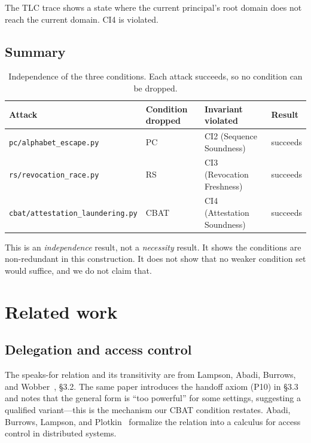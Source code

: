 \documentclass[11pt,a4paper]{article}
\theoremstyle{plain}
\theoremstyle{definition}
\theoremstyle{remark}
\begin{document}
The TLC trace shows a state where the current principal's root domain does
not reach the current domain. CI4 is violated.

\subsection{Summary}

\begin{table}[t]
\centering
\small
\begin{tabular}{@{}llll@{}}
\toprule
\textbf{Attack} & \textbf{Condition dropped} & \textbf{Invariant violated} & \textbf{Result} \\
\midrule
\texttt{pc/alphabet\_escape.py} & PC & CI2 (Sequence Soundness) & succeeds \\
\texttt{rs/revocation\_race.py} & RS & CI3 (Revocation Freshness) & succeeds \\
\texttt{cbat/attestation\_laundering.py} & CBAT & CI4 (Attestation Soundness) & succeeds \\
\bottomrule
\end{tabular}
\caption{Independence of the three conditions. Each attack succeeds, so no
condition can be dropped.}
\label{tab:independence}
\end{table}

This is an \emph{independence} result, not a \emph{necessity} result. It shows
the conditions are non-redundant in this construction. It does not show that
no weaker condition set would suffice, and we do not claim that.

\section{Related work}
\label{sec:related}

\subsection{Delegation and access control}

The speaks-for relation and its transitivity are from Lampson, Abadi, Burrows,
and Wobber~\cite{lampson1992authentication}, \S3.2. The same paper introduces
the handoff axiom (P10) in \S3.3 and notes that the general form is ``too
powerful'' for some settings, suggesting a qualified variant---this is the
mechanism our CBAT condition restates. Abadi, Burrows, Lampson, and
Plotkin~\cite{ablp1993calculus} formalize the relation into a calculus for
access control in distributed systems.
\end{document}
